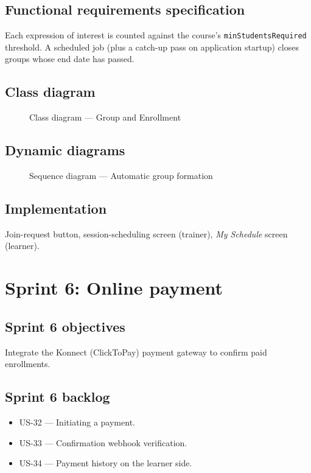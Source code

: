 \documentclass[a4paper,12pt]{report}
\begin{document}
\subsection{Functional requirements specification}
Each expression of interest is counted against the course's
\texttt{minStudentsRequired} threshold. A scheduled job (plus a catch-up
pass on application startup) closes groups whose end date has passed.

\subsection{Class diagram}
\begin{figure}[H]
\centering
\caption{Class diagram --- Group and Enrollment}
\end{figure}

\subsection{Dynamic diagrams}
\begin{figure}[H]
\centering
\caption{Sequence diagram --- Automatic group formation}
\end{figure}

\subsection{Implementation}
Join-request button, session-scheduling screen (trainer), \emph{My
Schedule} screen (learner).

\section{Sprint 6: Online payment}

\subsection{Sprint 6 objectives}
Integrate the Konnect (ClickToPay) payment gateway to confirm paid
enrollments.

\subsection{Sprint 6 backlog}
\begin{itemize}[leftmargin=*]
  \item US-32 --- Initiating a payment.
  \item US-33 --- Confirmation webhook verification.
  \item US-34 --- Payment history on the learner side.
\end{itemize}
\end{document}
